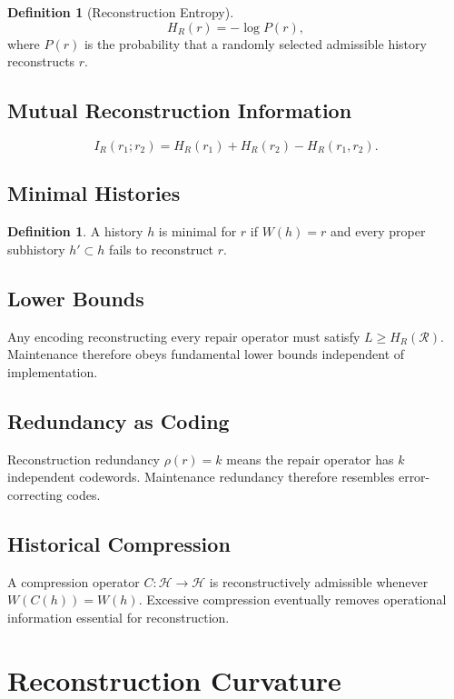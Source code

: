 \documentclass[12pt,oneside]{article}
\theoremstyle{plain}
\theoremstyle{definition}
\newtheorem{definition}[theorem]{Definition}
\theoremstyle{remark}
\theoremstyle{plain}
\newcommand{\Hist}{\mathcal{H}}
\begin{document}
\begin{definition}[Reconstruction Entropy]
\[
H_R(r) = -\log P(r),
\]
where $P(r)$ is the probability that a randomly selected admissible history reconstructs $r$.
\end{definition}

\subsection{Mutual Reconstruction Information}

\[
I_R(r_1; r_2) = H_R(r_1) + H_R(r_2) - H_R(r_1, r_2).
\]

\subsection{Minimal Histories}

\begin{definition}
A history $h$ is minimal for $r$ if $W(h) = r$ and every proper subhistory $h' \subset h$ fails
to reconstruct $r$.
\end{definition}

\subsection{Lower Bounds}

Any encoding reconstructing every repair operator must satisfy $L \ge H_R(\mathcal{R})$.
Maintenance therefore obeys fundamental lower bounds independent of implementation.

\subsection{Redundancy as Coding}

Reconstruction redundancy $\rho(r) = k$ means the repair operator has $k$ independent codewords.
Maintenance redundancy therefore resembles error-correcting codes.

\subsection{Historical Compression}

A compression operator $C : \Hist \rightarrow \Hist$ is reconstructively admissible whenever
$W(C(h)) = W(h)$. Excessive compression eventually removes operational information essential for
reconstruction.

\section{Reconstruction Curvature}
\end{document}
